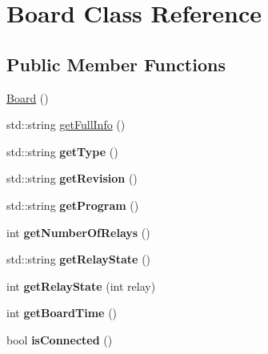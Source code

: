 \hypertarget{classBoard}{
\section{Board Class Reference}
\label{classBoard}
}
\subsection*{Public Member Functions}
\begin{DoxyCompactItemize}
\item 
\hyperlink{classBoard_a9ee491d4fea680cf69b033374a9fdfcb}{Board} ()
\item 
std::string \hyperlink{classBoard_a9a9fa1f7e205e393ea212bc054be46be}{getFullInfo} ()
\item 
\hypertarget{classBoard_a4b43da27d4db4ba3a68b14f6db44c5ba}{
std::string {\bfseries getType} ()}
\label{classBoard_a4b43da27d4db4ba3a68b14f6db44c5ba}

\item 
\hypertarget{classBoard_aa2d9f8e5dc0702922ef58934ee2a6df8}{
std::string {\bfseries getRevision} ()}
\label{classBoard_aa2d9f8e5dc0702922ef58934ee2a6df8}

\item 
\hypertarget{classBoard_a43afe5e27039e3e66002902d43ce9ed7}{
std::string {\bfseries getProgram} ()}
\label{classBoard_a43afe5e27039e3e66002902d43ce9ed7}

\item 
\hypertarget{classBoard_a7db376119050a045e5a0146415232b4a}{
int {\bfseries getNumberOfRelays} ()}
\label{classBoard_a7db376119050a045e5a0146415232b4a}

\item 
\hypertarget{classBoard_ab2d78c3d5fe9ed9b53bc8621350219c1}{
std::string {\bfseries getRelayState} ()}
\label{classBoard_ab2d78c3d5fe9ed9b53bc8621350219c1}

\item 
\hypertarget{classBoard_a3da918c8ef7e98486c832be42a9d39d4}{
int {\bfseries getRelayState} (int relay)}
\label{classBoard_a3da918c8ef7e98486c832be42a9d39d4}

\item 
\hypertarget{classBoard_a5cc59ab93c04dc73969648439bde431a}{
int {\bfseries getBoardTime} ()}
\label{classBoard_a5cc59ab93c04dc73969648439bde431a}

\item 
\hypertarget{classBoard_aa3aca9c88882d7579eb63b586befbad0}{
bool {\bfseries isConnected} ()}
\label{classBoard_aa3aca9c88882d7579eb63b586befbad0}

\end{DoxyCompactItemize}



